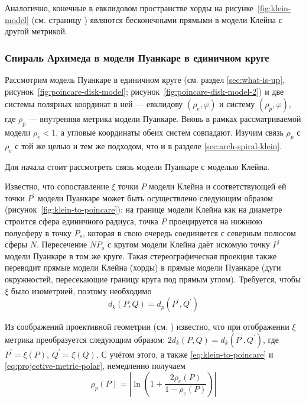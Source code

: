 \documentclass{article}
\numberwithin{equation}{section}
\renewcommand{\phi}{\varphi}
\providecommand{\abs}[1]{\left \lvert{#1}\right \rvert}
\begin{document}
Аналогично, конечные в евклидовом пространстве хорды на
рисунке \ref{fig:klein-model} (см. страницу \pageref{fig:klein-model})
являются бесконечными прямыми в модели Клейна с другой метрикой.

\subsubsection{Спираль Архимеда в модели Пуанкаре в единичном круге}
\label{sec:arch-spiral-poincare}

Рассмотрим модель Пуанкаре в единичном круге (см. раздел
\ref{sec:what-is-up}, рисунок \ref{fig:poincare-disk-model};
рисунок \ref{fig:poincare-disk-model-2}) и две системы полярных
координат в ней — евклидову $(\rho_e, \phi)$ и систему $(\rho_p,
\phi)$, где $\rho_p$ — внутренняя метрика модели Пуанкаре. Вновь в
рамках рассматриваемой модели $\rho_e<1$, а угловые координаты обеих
систем совпадают. Изучим связь $\rho_p$ с $\rho_e$ с той же целью и
тем же подходом, что и в разделе \ref{sec:arch-spiral-klein}.



Для начала стоит рассмотреть связь модели Пуанкаре с моделью Клейна.



Известно, что сопоставление $\xi$ точки $P$ модели Клейна и
соответствующей ей точки $P^\prime$ модели Пуанкаре может быть
осуществлено следующим образом (рисунок \ref{fig:klein-to-poincare}):
на границе модели Клейна как на диаметре строится сфера единичного
радиуса, точка $P$ проецируется на нижнюю полусферу в точку $P_s$,
которая в свою очередь соединяется с северным полюсом сферы $N$.
Пересечение $NP_s$ с кругом модели Клейна даёт искомую точку
$P^\prime$ модели Пуанкаре в том же круге. Такая стереографическая
проекция также переводит прямые модели Клейна (хорды) в прямые модели
Пуанкаре (дуги окружностей, пересекающие границу круга под прямым
углом). Требуется, чтобы $\xi$ было изометрией, поэтому необходимо
\begin{equation}\label{eq:klein-to-poincare}
  d_k(P,Q) = d_p(P^\prime,Q^\prime)
\end{equation}

Из соображений проективной геометрии (см. \cite{prasolov04}) известно,
что при отображении $\xi$ метрика преобразуется следующим образом:
$2d_k(P,Q) = d_k(P^\prime, Q^\prime)$, где
$P^\prime=\xi(P),\,Q^\prime=\xi(Q)$. С учётом этого, а также
\eqref{eq:klein-to-poincare} и \eqref{eq:projective-metric-polar},
немедленно получаем
\begin{equation}\label{eq:poincare-metric-polar}
 \rho_p(P) = \abs{\ln\left(1+\frac{2\rho_e(P)}{1-\rho_e(P)}\right)}  
\end{equation}
\end{document}
